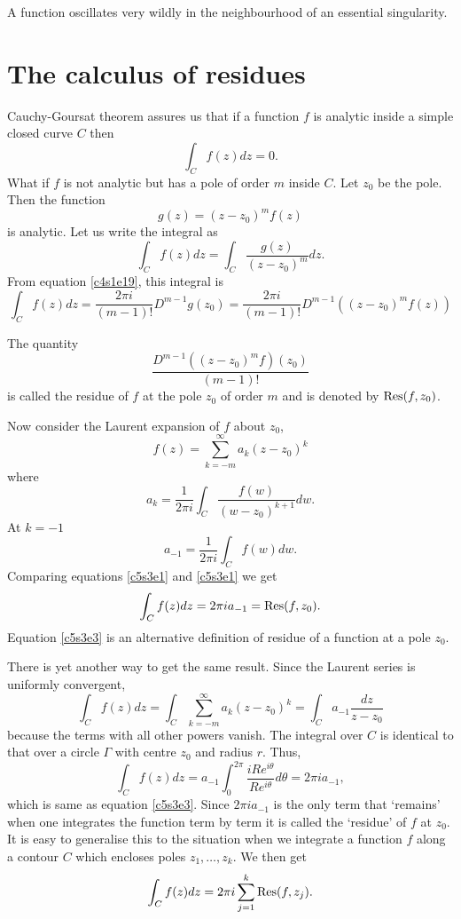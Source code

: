 \begin{rem}
A function oscillates very wildly in the neighbourhood of an essential singularity.
\end{rem}

\section{The calculus of residues}\label{c5s3}
Cauchy-Goursat theorem assures us that if a function $f$ is analytic inside a simple
closed curve $C$ then
\[
\int_C f(z)dz = 0.
\]
What if $f$ is not analytic but has a pole of order $m$ inside $C$. Let $z_0$
be the pole. Then the function
\[
g(z) = (z - z_0)^mf(z)
\]
is analytic. Let us write the integral as
\[
\int_C f(z)dz = \int_C \frac{g(z)}{(z - z_0)^m}dz.
\]
From equation \eqref{c4s1e19}, this integral is
\begin{equation}\label{c5s3e1}
\int_C f(z) dz = \frac{2\pi i}{(m-1)!}D^{m-1}g(z_0) = 
\frac{2\pi i}{(m-1)!}D^{m-1}((z - z_0)^mf(z))
\end{equation}

\begin{defn}\label{c5s3d1}
The quantity
\[
\frac{D^{m-1}((z - z_0)^mf)(z_0)}{(m-1)!}
\]
is called the residue of $f$ at the pole $z_0$ of order $m$ and is denoted by 
$\operatorname{Res}(f,z_0)$.
\end{defn}

Now consider the Laurent expansion of $f$ about $z_0$,
\[
f(z) = \sum_{k=-m}^\infty a_k(z - z_0)^k
\]
where
\[
a_k = \frac{1}{2\pi i}\int_C \frac{f(w)}{(w - z_0)^{k+1}}dw.
\]
At $k = -1$
\begin{equation}\label{c5s3e2}
a_{-1} = \frac{1}{2\pi i}\int_C f(w)dw.
\end{equation}
Comparing equations \eqref{c5s3e1} and \eqref{c5s3e1} we get
\begin{equation}\label{c5s3e3}
\int_C f(z)dz = 2\pi i a_{-1} = \operatorname{Res}(f, z_0).
\end{equation}
Equation \eqref{c5s3e3} is an alternative definition of residue of a 
function at a pole $z_0$.

There is yet another way to get the same result. Since the Laurent series
is uniformly convergent,
\[
\int_C f(z)dz = \int_C \sum_{k=-m}^\infty a_k(z - z_0)^k = 
\int_C a_{-1}\frac{dz}{z - z_0}
\]
because the terms with all other powers vanish. The integral over $C$ is identical 
to that over a circle $\Gamma$ with centre $z_0$ and radius $r$. Thus,
\[
\int_C f(z)dz = a_{-1}\int_0^{2\pi}\frac{iRe^{i\theta}}{Re^{i\theta}}d\theta 
= 2\pi ia_{-1},
\]
which is same as equation \eqref{c5s3e3}. Since $2\pi ia_{-1}$ is the only
term that `remains' when one integrates the function term by term it is called
the `residue' of $f$ at $z_0$. It is easy to generalise this to the situation
when we integrate a function $f$ along a contour $C$ which encloses poles
$z_1, \ldots, z_k$. We then get
\begin{equation}\label{c5s3e4}
\int_C f(z)dz = 2\pi i \sum_{j=1}^k \operatorname{Res}(f, z_j).
\end{equation}

